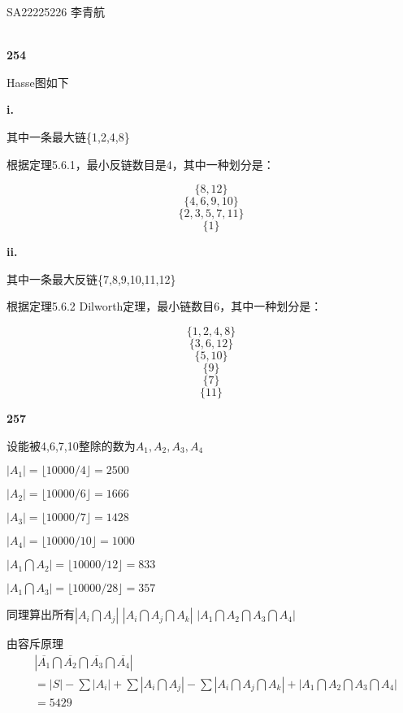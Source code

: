 \documentclass[UTF8]{ctexart}
\begin{document}
SA22225226 李青航

~\\
\noindent\textbf{254}

Hasse图如下


\textbf{i. }

其中一条最大链\{1,2,4,8\}

根据定理5.6.1，最小反链数目是4，其中一种划分是：

$$\{8,12\}$$
$$\{4,6,9,10\}$$
$$\{2,3,5,7,11\}$$
$$\{1\}$$

\textbf{ii. }

其中一条最大反链\{7,8,9,10,11,12\}

根据定理5.6.2 Dilworth定理，最小链数目6，其中一种划分是：

$$\{1,2,4,8\}$$
$$\{3,6,12\}$$
$$\{5,10\}$$
$$\{9\}$$
$$\{7\}$$
$$\{11\}$$

\newpage
\noindent\textbf{257}

设能被4,6,7,10整除的数为$A_1,A_2,A_3,A_4$

$|A_1|=\lfloor 10000/4 \rfloor=2500$

$|A_2|=\lfloor 10000/6 \rfloor= 1666$

$|A_3|=\lfloor 10000/7 \rfloor =1428$

$|A_4|=\lfloor 10000/10 \rfloor =1000$

$|A_1\bigcap A_2|=\lfloor 10000/12 \rfloor=833$

$|A_1\bigcap A_3|=\lfloor 10000/28 \rfloor = 357$

同理算出所有$|A_i\bigcap A_j|$ $|A_i\bigcap A_j \bigcap A_k|$
 $|A_1\bigcap A_2 \bigcap A_3 \bigcap A_4|$


由容斥原理
\begin{equation}
  \nonumber
  \begin{split}
    &
    |\overline{A_1} \bigcap \overline{A_2}
    \bigcap \overline{A_3} \bigcap \overline{A_4}|\\
    &=
    |S|-\sum {|A_i|} +\sum{|A_i \bigcap A_j|}
    -\sum{|A_i\bigcap A_j \bigcap A_k|}
    +{|A_1\bigcap A_2\bigcap A_3\bigcap A_4|}\\
    &=5429
  \end{split}
\end{equation}
\end{document}
